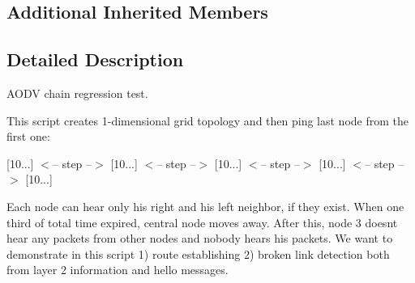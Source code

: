 \subsection*{Additional Inherited Members}


\subsection{Detailed Description}
A\+O\+DV chain regression test. 

This script creates 1-\/dimensional grid topology and then ping last node from the first one\+:

\mbox{[}10...\mbox{]} $<$-- step --$>$ \mbox{[}10...\mbox{]} $<$-- step --$>$ \mbox{[}10...\mbox{]} $<$-- step --$>$ \mbox{[}10...\mbox{]} $<$-- step --$>$ \mbox{[}10...\mbox{]}

Each node can hear only his right and his left neighbor, if they exist. When one third of total time expired, central node moves away. After this, node 3 doesn\textquotesingle{}t hear any packets from other nodes and nobody hears his packets. We want to demonstrate in this script 1) route establishing 2) broken link detection both from layer 2 information and hello messages.

